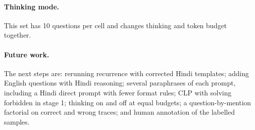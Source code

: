\documentclass[11pt]{article}
\begin{document}
\paragraph{Thinking mode.} This set has 10 questions per cell and changes thinking and token budget together.

\paragraph{Future work.} The next steps are: rerunning recurrence with corrected Hindi templates; adding English questions with Hindi reasoning; several paraphrases of each prompt, including a Hindi direct prompt with fewer format rules; CLP with solving forbidden in stage 1; thinking on and off at equal budgets; a question-by-mention factorial on correct and wrong traces; and human annotation of the labelled samples.



\clearpage
\appendix

\end{document}
